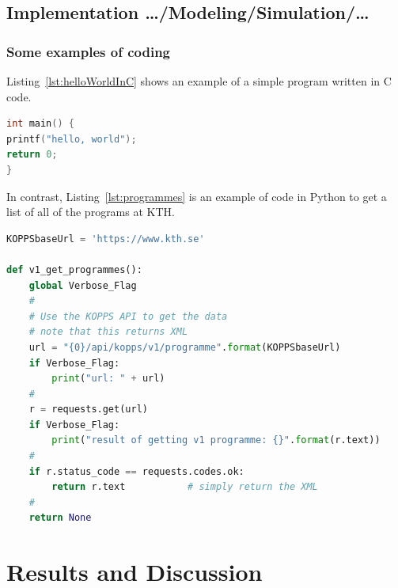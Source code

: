 \documentclass[english]{kththesis}
\begin{document}
\section{Implementation …/Modeling/Simulation/…}
\label{sec:implementationDetails}

\subsection{Some examples of coding}

Listing~\ref{lst:helloWorldInC} shows an example of a simple program written
in C code.

\begin{lstlisting}[language={C}, caption={Hello world in C code}, label=lst:helloWorldInC]
int main() {
printf("hello, world");
return 0;
}
\end{lstlisting}


In contrast, Listing~\ref{lst:programmes} is an example of code in Python to
get a list of all of the programs at KTH.

\lstset{extendedchars=true}
\begin{lstlisting}[language={Python}, caption={Using a python program to
    access the KTH API to get all of the programs at KTH}, label=lst:programmes]
KOPPSbaseUrl = 'https://www.kth.se'

def v1_get_programmes():
    global Verbose_Flag
    #
    # Use the KOPPS API to get the data
    # note that this returns XML
    url = "{0}/api/kopps/v1/programme".format(KOPPSbaseUrl)
    if Verbose_Flag:
        print("url: " + url)
    #
    r = requests.get(url)
    if Verbose_Flag:
        print("result of getting v1 programme: {}".format(r.text))
    #
    if r.status_code == requests.codes.ok:
        return r.text           # simply return the XML
    #
    return None
\end{lstlisting}


\cleardoublepage
\chapter{Results and Discussion}
\label{ch:resultsAndDiscussion}
\end{document}

